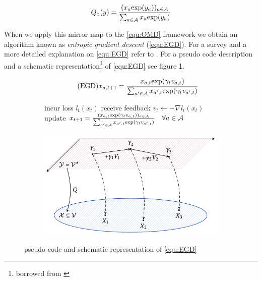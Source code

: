 \begin{equation*}
    Q_x(y) = \frac{(x_a\textnormal{exp}(y_a))_{a\in\mathcal{A}}}{\sum_{a\in\mathcal{A}}x_a\textnormal{exp}(y_a)}
\end{equation*}

When we apply this mirror map to the \ref{equ:OMD} framework we obtain an algorithm known as \textit{entropic gradient descent} (\ref{equ:EGD}). For a survey and a more detailed explanation on \ref{equ:EGD} refer to \cite{shalev}. For a pseudo code description and a schematic representation\footnote{borrowed from \cite[Chapter 2]{HDRmertikopoulos}} of \ref{equ:EGD} see figure \ref{fig:EGDpseudoCodeAndScheme}.

\begin{equation}
    \tag{EGD}
    x_{a,t+1} = \frac{x_{a,t}\textnormal{exp}(\gamma_t v_{a,t})}{\sum_{a'\in\mathcal{A}}x_{a',t}\textnormal{exp}(\gamma_t v_{a',t})}
    \label{equ:EGD}
\end{equation}


\begin{figure}[H]
\centering
\begin{subfigure}{.55\textwidth}
    \begin{algorithm}[H]
    \DontPrintSemicolon
     {
    incur loss $l_t(x_t)$ \;
    receive feedback $v_t \gets -\nabla l_t(x_t)$ \;
    update $x_{t+1} = \frac{(x_{a,t}\textnormal{exp}(\gamma_t v_{a,t}))_{a\in\mathcal{A}}}{\sum_{a'\in\mathcal{A}}x_{a',t}\textnormal{exp}(\gamma_t v_{a',t})} \quad \forall a \in \mathcal{A}$ \;
    }
    \end{algorithm}
\end{subfigure}%
\begin{subfigure}{.45\textwidth}
  \centering
  \includegraphics[width=\textwidth]{logos/EGDscheme.png}
\end{subfigure}
\caption{pseudo code and schematic representation of \ref{equ:EGD}}
\label{fig:EGDpseudoCodeAndScheme}
\end{figure}

